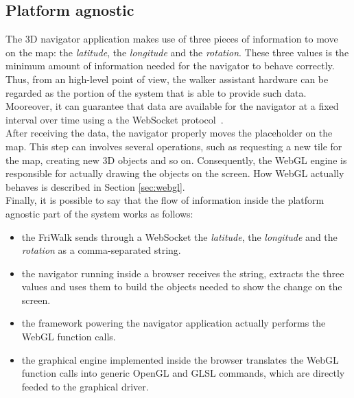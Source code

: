 \subsection{Platform agnostic}
The 3D navigator application makes use of three pieces of information to move on
the map: the \emph{latitude}, the \emph{longitude} and the \emph{rotation}.
These three values is the
minimum amount of information needed for the navigator to behave correctly. Thus,
from an high-level point of view, the walker assistant hardware can be regarded
as the portion of the system that is able to provide such data. Mooreover, it can
guarantee that data are available for the navigator at a fixed interval over time
using a the WebSocket protocol~\cite{fette2011websocket}.\\
After receiving the data, the navigator properly moves the placeholder on the map.
This step can involves several operations, such as requesting a new tile for the
map, creating new 3D objects and so on. Consequently, the WebGL engine is responsible
for actually drawing the objects on the screen. How WebGL actually behaves
is described in Section \ref{sec:webgl}.\\
Finally, it is possible to say that the flow of information inside the platform
agnostic part of the system works as follows:
\begin{itemize}
    \item the FriWalk sends through a WebSocket the \emph{latitude}, the
        \emph{longitude} and the \emph{rotation} as a comma-separated string.
    \item the navigator running inside a browser receives the string, extracts
        the three values and uses them to build the objects needed to show the
        change on the screen.
    \item the framework powering the navigator application actually performs the
        WebGL function calls.
    \item the graphical engine implemented inside the browser translates the WebGL
        function calls into generic OpenGL and GLSL commands, which are directly
        feeded to the graphical driver.
\end{itemize}



